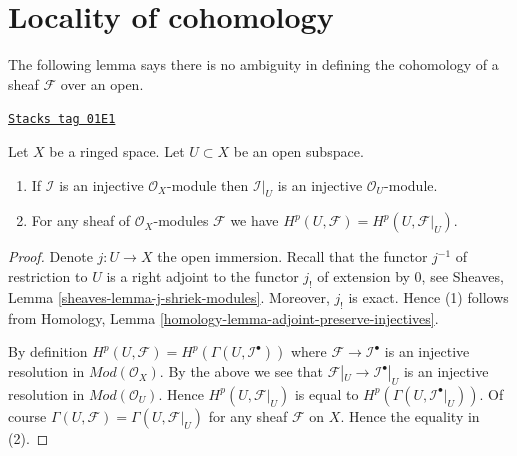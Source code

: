 \section{Locality of cohomology}
\label{cohomology-section-locality}
The following lemma says there is no ambiguity in defining the cohomology
of a sheaf $\mathcal{F}$ over an open.

\begin{lemma}
\label{cohomology-lemma-cohomology-of-open}
\href{https://stacks.math.columbia.edu/tag/01E1}{\texttt{Stacks tag 01E1}}

Let $X$ be a ringed space.
Let $U \subset X$ be an open subspace.
\begin{enumerate}
\item If $\mathcal{I}$ is an injective $\mathcal{O}_X$-module
then $\mathcal{I}|_U$ is an injective $\mathcal{O}_U$-module.
\item For any sheaf of $\mathcal{O}_X$-modules $\mathcal{F}$ we have
$H^p(U, \mathcal{F}) = H^p(U, \mathcal{F}|_U)$.
\end{enumerate}
\end{lemma}

\begin{proof}
Denote $j : U \to X$ the open immersion.
Recall that the functor $j^{-1}$ of restriction to $U$ is a right adjoint
to the functor $j_!$ of extension by $0$, see
Sheaves, Lemma \ref{sheaves-lemma-j-shriek-modules}.
Moreover, $j_!$ is exact. Hence (1) follows from
Homology, Lemma \ref{homology-lemma-adjoint-preserve-injectives}.

\medskip\noindent
By definition $H^p(U, \mathcal{F}) = H^p(\Gamma(U, \mathcal{I}^\bullet))$
where $\mathcal{F} \to \mathcal{I}^\bullet$ is an injective resolution
in $\textit{Mod}(\mathcal{O}_X)$.
By the above we see that $\mathcal{F}|_U \to \mathcal{I}^\bullet|_U$
is an injective resolution in $\textit{Mod}(\mathcal{O}_U)$.
Hence $H^p(U, \mathcal{F}|_U)$ is equal to
$H^p(\Gamma(U, \mathcal{I}^\bullet|_U))$.
Of course $\Gamma(U, \mathcal{F}) = \Gamma(U, \mathcal{F}|_U)$ for
any sheaf $\mathcal{F}$ on $X$.
Hence the equality
in (2).
\end{proof}

